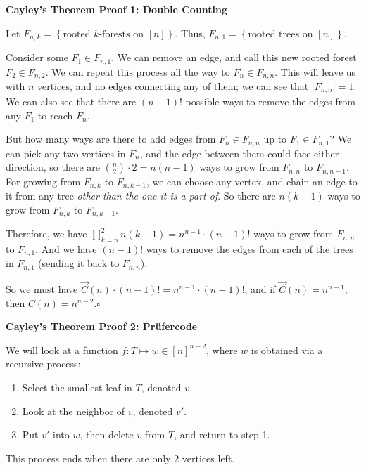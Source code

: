 \documentclass[10pt,letterpaper]{article}
\newcommand{\n}{\hfill\break}
\newcommand{\proven}{\;$\square$\n}
\newcommand{\card}[1]{\left|#1\right|}
\newcommand{\set}[1]{\left\{#1\right\}}
\begin{document}
\newpage

\par\noindent\textbf{Cayley's Theorem Proof 1: Double Counting}
\par\noindent Let $F_{n,k}=\set{\textrm{rooted $k$-forests on }[n]}$. Thus, $F_{n,1}=\set{\textrm{rooted trees on }[n]}$.
\par\noindent Consider some $F_{1}\in{}F_{n,1}$. We can remove an edge, and call this new rooted forest $F_{2}\in{}F_{n,2}$. We can repeat this process all the way to $F_{n}\in{}F_{n,n}$. This will leave us with $n$ vertices, and no edges connecting any of them; we can see that $\card{F_{n,n}}=1$. We can also see that there are $(n-1)!$ possible ways to remove the edges from any $F_{1}$ to reach $F_{n}$.\n

\par\noindent But how many ways are there to add edges from $F_{n}\in{}F_{n,n}$ up to $F_{1}\in{}F_{n,1}$? We can pick any two vertices in $F_{n}$, and the edge between them could face either direction, so there are $\binom{n}{2}\cdot{}2=n(n-1)$ ways to grow from $F_{n,n}$ to $F_{n,n-1}$. For growing from $F_{n,k}$ to $F_{n,k-1}$, we can choose any vertex, and chain an edge to it from any tree \textit{other than the one it is a part of}. So there are $n(k-1)$ ways to grow from $F_{n,k}$ to $F_{n,k-1}$.\n

\par\noindent Therefore, we have $\displaystyle\prod_{k=n}^{2}n(k-1)=n^{n-1}\cdot{}(n-1)!$ ways to grow from $F_{n,n}$ to $F_{n,1}$. And we have $(n-1)!$ ways to remove the edges from each of the trees in $F_{n,1}$ (sending it back to $F_{n,n}$).
\par\noindent So we must have $\displaystyle\overrightarrow{C}(n)\cdot(n-1)!=n^{n-1}\cdot{}(n-1)!$, and if $\overrightarrow{C}(n)=n^{n-1}$, then $C(n)=n^{n-2}$.\proven

\par\noindent\textbf{Cayley's Theorem Proof 2: Pr\"ufercode}
\par\noindent We will look at a function $f:T\mapsto{}w\in[n]^{n-2}$, where $w$ is obtained via a recursive process:
\begin{enumerate}
\item Select the smallest leaf in $T$, denoted $v$.
\item Look at the neighbor of $v$, denoted $v'$.
\item Put $v'$ into $w$, then delete $v$ from $T$, and return to step 1.
\end{enumerate}
\par\noindent This process ends when there are only $2$ vertices left.\n
\end{document}
